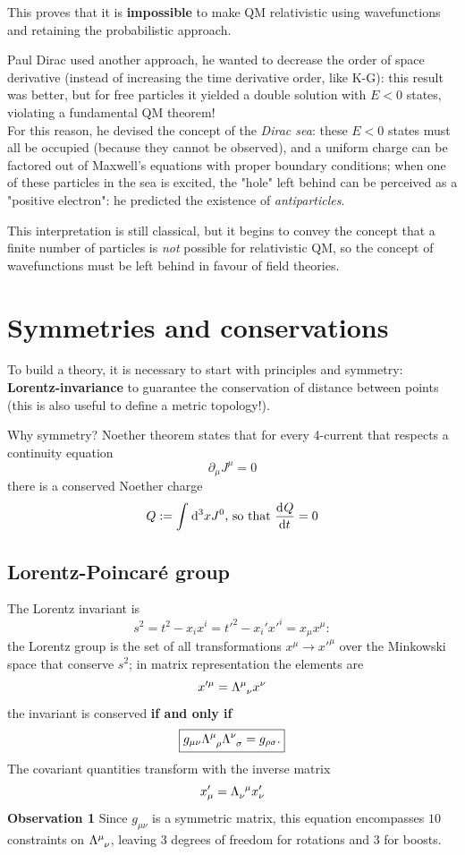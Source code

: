 This proves that it is \textbf{impossible} to make QM relativistic using wavefunctions and retaining
the probabilistic approach.

Paul Dirac used another approach, he wanted to decrease the order of space derivative (instead of
increasing the time derivative order, like K-G): this result was better, but for free particles
it yielded a double solution with $E<0$ states, violating a fundamental QM theorem!\\
For this reason, he devised the concept of the \textit{Dirac sea}:
these $E<0$ states must all be occupied (because they cannot be observed), and a uniform charge
can be factored out of Maxwell's equations with proper boundary conditions; when one of these
particles in the sea is excited, the "hole" left behind can be perceived as a "positive electron":
he predicted the existence of \textit{antiparticles}.

This interpretation is still classical, but it begins to convey the concept that a finite number
of particles is \textit{not} possible for relativistic QM, so the concept of wavefunctions must be
left behind in favour of field theories.
\section{Symmetries and conservations}
To build a theory, it is necessary to start with principles and symmetry:
\textbf{Lorentz-invariance} to guarantee the conservation of distance between points (this is also
useful to define a metric topology!).

Why symmetry? Noether theorem states that for every 4-current that respects a continuity equation
$$\partial_\mu J^\mu=0$$
there is a conserved Noether charge
$$Q:=\int_{}^{}\dd^3xJ^0\text{, so that }\dv[]{Q}{t}=0$$
\subsection{Lorentz-Poincaré group}
The Lorentz invariant is
$$s^2=t^2-x_ix^i = t'^2-x_i'x'^i = x_\mu x^\mu:$$
the Lorentz group is the set of all transformations $x^\mu\rightarrow x'^\mu$ over the Minkowski
space that conserve $s^2$; in matrix representation the elements are
$$x'^\mu = \Lambda\indices{^\mu_\nu} x^\nu$$
the invariant is conserved \textbf{if and only if}
$$\boxed{g_{\mu\nu}\Lambda\indices{^\mu_\rho}\Lambda\indices{^\nu_\sigma} = g_{\rho\sigma}.}$$
The covariant quantities transform with the inverse matrix
$$x'_\mu = \Lambda\indices{_\nu^\mu} x'_\nu$$
\textbf{Observation 1} Since $g_{\mu\nu}$ is a symmetric matrix, this equation encompasses $10$
constraints on $\Lambda\indices{^\mu_\nu}$, leaving $3$ degrees of freedom for rotations and $3$ for
boosts.

